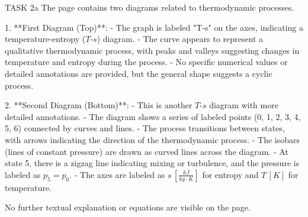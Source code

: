 TASK 2a  
The page contains two diagrams related to thermodynamic processes.  

1. **First Diagram (Top)**:  
   - The graph is labeled "T-s" on the axes, indicating a temperature-entropy (\( T \)-\( s \)) diagram.  
   - The curve appears to represent a qualitative thermodynamic process, with peaks and valleys suggesting changes in temperature and entropy during the process.  
   - No specific numerical values or detailed annotations are provided, but the general shape suggests a cyclic process.  

2. **Second Diagram (Bottom)**:  
   - This is another \( T \)-\( s \) diagram with more detailed annotations.  
   - The diagram shows a series of labeled points (0, 1, 2, 3, 4, 5, 6) connected by curves and lines.  
   - The process transitions between states, with arrows indicating the direction of the thermodynamic process.  
   - The isobars (lines of constant pressure) are drawn as curved lines across the diagram.  
   - At state 5, there is a zigzag line indicating mixing or turbulence, and the pressure is labeled as \( p_5 = p_0 \).  
   - The axes are labeled as \( s \, [\frac{kJ}{kg \cdot K}] \) for entropy and \( T \, [K] \) for temperature.  

No further textual explanation or equations are visible on the page.